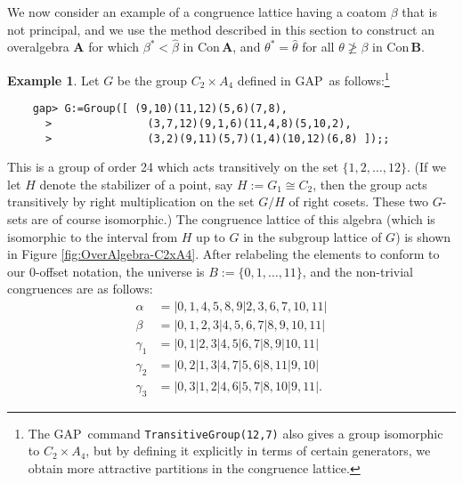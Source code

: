 \documentclass[cm,dissertation,actual,final]{uhthesis}
\theoremstyle{plain}
\theoremstyle{definition}
\newtheorem{example}[theorem]{Example}
\theoremstyle{remark}
\numberwithin{theorem}{section}
\numberwithin{claim}{chapter}
\numberwithin{equation}{section}
\numberwithin{conjecture}{chapter}
\newcommand{\<}{\ensuremath{\langle}}
\renewcommand{\>}{\ensuremath{\rangle}}
\renewcommand{\ngeq}{\ensuremath{\ngeqslant}}
\newcommand{\Con}{\ensuremath{\mathrm{Con\,}}}
\newcommand{\GAP}{\textsf{GAP}}
\newcommand{\0}{\ensuremath{\mathbf{0}}}
\newcommand{\1}{\ensuremath{\mathbf{1}}}
\newcommand{\2}{\ensuremath{\mathbf{2}}}
\newcommand{\3}{\ensuremath{\mathbf{3}}}
\newcommand{\4}{\ensuremath{\mathbf{4}}}
\newcommand{\5}{\ensuremath{\mathbf{5}}}
\newcommand{\bA}{\ensuremath{\mathbf{A}}}
\newcommand{\bB}{\ensuremath{\mathbf{B}}}
\begin{document}
We now consider an example of a congruence lattice having a coatom $\beta$ that is not principal,
and we use the method described in this section to construct an overalgebra $\bA$ for which
$\beta^* < \widehat{\beta}$ in $\Con \bA$, and 
$\theta^* = \widehat{\theta}$ for all $\theta \ngeq \beta$ in $\Con\bB$.

\begin{example}
  
  Let $G$ be the group $C_2 \times A_4$ defined in \GAP\ as
  follows:\footnote{The \GAP\ command {\tt TransitiveGroup(12,7)} also gives a group
    isomorphic to $C_2 \times A_4$, but by defining it explicitly
    in terms of certain generators, we obtain more attractive partitions in the
    congruence lattice.}

  {\footnotesize
\begin{verbatim}
    gap> G:=Group([ (9,10)(11,12)(5,6)(7,8), 
      >               (3,7,12)(9,1,6)(11,4,8)(5,10,2), 
      >               (3,2)(9,11)(5,7)(1,4)(10,12)(6,8) ]);;
\end{verbatim}
  }

  \noindent This is a group of order 24 which acts transitively 
  on the set $\{1, 2, \dots, 12\}$.
  (If we let $H$ denote the stabilizer of a point, say $H:=G_1 \cong C_2$,
  then the group acts transitively by right multiplication on the set $G/H$ of right
  cosets. These two $G$-sets are of course isomorphic.)
  The congruence lattice of this algebra (which is isomorphic
  to the interval from $H$ up to $G$ in the subgroup lattice of $G$) is shown in 
  Figure \ref{fig:OverAlgebra-C2xA4}.
  After relabeling the elements to conform to our
  0-offset notation, the universe is
  $B:=\{0, 1, \dots, 11\}$, and 
  the non-trivial congruences are as follows:
  \begin{align*}
    \alpha &=|0, 1, 4, 5, 8, 9| 2, 3, 6, 7, 10, 11|\\
    \beta &= | 0, 1, 2, 3 | 4, 5, 6, 7 | 8, 9, 10, 11|\\
    \gamma_1 &=| 0, 1 | 2, 3 | 4, 5 | 6, 7 | 8, 9 | 10, 11|\\
    \gamma_2 &=| 0, 2 | 1, 3 | 4, 7 | 5, 6 | 8, 11 | 9, 10 |\\
    \gamma_3 &=| 0, 3 | 1, 2 | 4, 6 | 5, 7 | 8, 10 | 9, 11 |.
  \end{align*}

  \begin{figure}[h!]
    \centering
\end{figure}
\end{example}
\end{document}

